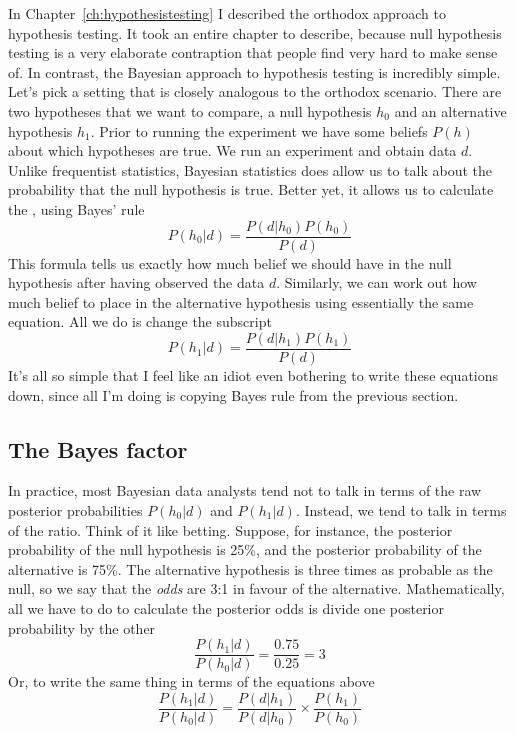 In Chapter~\ref{ch:hypothesistesting} I described the orthodox approach to hypothesis testing. It took an entire chapter to describe, because null hypothesis testing is a very elaborate contraption that people find very hard to make sense of. In contrast, the Bayesian approach to hypothesis testing is incredibly simple. Let's pick a setting that is closely analogous to the orthodox scenario. There are two hypotheses that we want to compare, a null hypothesis $h_0$ and an alternative hypothesis $h_1$. Prior to running the experiment we have some beliefs $P(h)$ about which hypotheses are true. We run an experiment and obtain data $d$. Unlike frequentist statistics, Bayesian statistics does allow us to talk about the probability that the null hypothesis is true. Better yet, it allows us to calculate the , using Bayes' rule
$$
P(h_0 | d) = \frac{P(d|h_0) P(h_0)}{P(d)}
$$
This formula tells us exactly how much belief we should have in the null hypothesis after having observed the data $d$. Similarly, we can work out how much belief to place in the alternative hypothesis using essentially the same equation. All we do is change the subscript
$$
P(h_1 | d) = \frac{P(d|h_1) P(h_1)}{P(d)}
$$
It's all so simple that I feel like an idiot even bothering to write these equations down, since all I'm doing is copying Bayes rule from the previous section.

\subsection{The Bayes factor}

In practice, most Bayesian data analysts tend not to talk in terms of the raw posterior probabilities $P(h_0|d)$ and $P(h_1|d)$. Instead, we tend to talk in terms of the  ratio. Think of it like betting. Suppose, for instance, the posterior probability of the null hypothesis is 25\%, and the posterior probability of the alternative is 75\%. The alternative hypothesis is three times as probable as the null, so we say that the {\it odds} are 3:1 in favour of the alternative. Mathematically, all we have to do to calculate the posterior odds is divide one posterior probability by the other
$$
\frac{P(h_1 | d)}{P(h_0 | d)} = \frac{0.75}{0.25} = 3
$$
Or, to write the same thing in terms of the equations above
$$
\frac{P(h_1 | d)}{P(h_0 | d)} = \frac{P(d|h_1)}{P(d|h_0)} \times \frac{P(h_1)}{P(h_0)}
$$

